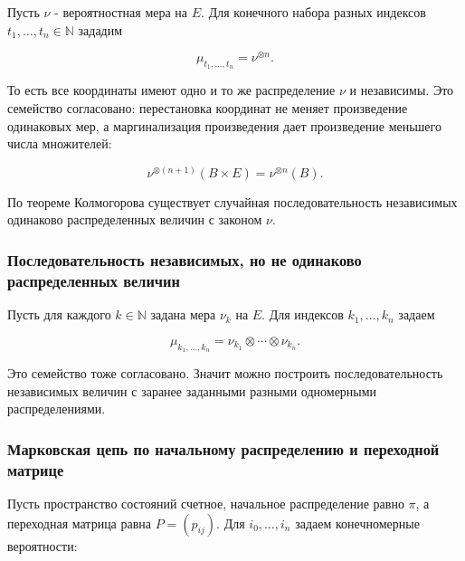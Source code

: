 \documentclass[
  11pt,
  a4paper,
]{article}
\begin{document}
Пусть \(\nu\) - вероятностная мера на \(E\). Для конечного набора разных
индексов \(t_1,\ldots,t_n\in\mathbb N\) зададим

\[
\mu_{t_1,\ldots,t_n}
=
\nu^{\otimes n}.
\]

То есть все координаты имеют одно и то же распределение \(\nu\) и
независимы. Это семейство согласовано: перестановка координат не меняет
произведение одинаковых мер, а маргинализация произведения дает
произведение меньшего числа множителей:

\[
\nu^{\otimes(n+1)}(B\times E)=\nu^{\otimes n}(B).
\]

По теореме Колмогорова существует случайная последовательность
независимых одинаково распределенных величин с законом \(\nu\).

\subsubsection{Последовательность независимых, но не одинаково
распределенных
величин}\label{ux43fux43eux441ux43bux435ux434ux43eux432ux430ux442ux435ux43bux44cux43dux43eux441ux442ux44c-ux43dux435ux437ux430ux432ux438ux441ux438ux43cux44bux445-ux43dux43e-ux43dux435-ux43eux434ux438ux43dux430ux43aux43eux432ux43e-ux440ux430ux441ux43fux440ux435ux434ux435ux43bux435ux43dux43dux44bux445-ux432ux435ux43bux438ux447ux438ux43d}

Пусть для каждого \(k\in\mathbb N\) задана мера \(\nu_k\) на \(E\). Для
индексов \(k_1,\ldots,k_n\) задаем

\[
\mu_{k_1,\ldots,k_n}
=
\nu_{k_1}\otimes\cdots\otimes\nu_{k_n}.
\]

Это семейство тоже согласовано. Значит можно построить
последовательность независимых величин с заранее заданными разными
одномерными распределениями.

\subsubsection{Марковская цепь по начальному распределению и переходной
матрице}\label{ux43cux430ux440ux43aux43eux432ux441ux43aux430ux44f-ux446ux435ux43fux44c-ux43fux43e-ux43dux430ux447ux430ux43bux44cux43dux43eux43cux443-ux440ux430ux441ux43fux440ux435ux434ux435ux43bux435ux43dux438ux44e-ux438-ux43fux435ux440ux435ux445ux43eux434ux43dux43eux439-ux43cux430ux442ux440ux438ux446ux435}

Пусть пространство состояний счетное, начальное распределение равно
\(\pi\), а переходная матрица равна \(P=(p_{ij})\). Для
\(i_0,\ldots,i_n\) задаем конечномерные вероятности:
\end{document}
